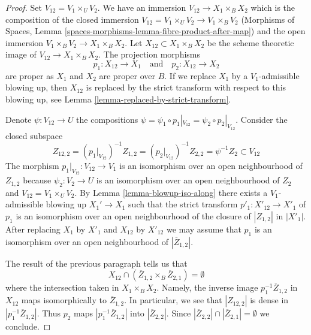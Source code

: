 \documentclass[10pt,a4paper]{amsart}
\theoremstyle{plain}
\theoremstyle{definition}
\theoremstyle{remark}
\numberwithin{equation}{subsection}
\begin{document}
\begin{proof}
\medskip\noindent
Set $V_{12} = V_1 \times_U V_2$. We have an immersion
$V_{12} \to X_1 \times_B X_2$ which is the composition of the closed
immersion $V_{12} = V_1 \times_U V_2 \to V_1 \times_B V_2$
(Morphisms of Spaces, Lemma
\ref{spaces-morphisms-lemma-fibre-product-after-map})
and the open immersion $V_1 \times_B V_2 \to X_1 \times_B X_2$.
Let $X_{12} \subset X_1 \times_B X_2$ be the scheme theoretic image of
$V_{12} \to X_1 \times_B X_2$. The projection morphisms
$$
p_1 : X_{12} \to X_1
\quad\text{and}\quad
p_2 : X_{12} \to X_2
$$
are proper as $X_1$ and $X_2$ are proper over $B$. If we replace $X_1$ by a
$V_1$-admissible blowing up, then $X_{12}$ is replaced by
the strict transform with respect to this blowing up, see
Lemma \ref{lemma-replaced-by-strict-transform}.

\medskip\noindent
Denote $\psi : V_{12} \to U$ the compositions
$\psi = \psi_1 \circ p_1|_{V_{12}} = \psi_2 \circ p_2|_{V_{12}}$.
Consider the closed subspace
$$
Z_{12, 2} =
(p_1|_{V_{12}})^{-1}Z_{1, 2} =
(p_2|_{V_{12}})^{-1}Z_{2, 2} =
\psi^{-1}Z_2 \subset V_{12}
$$
The morphism $p_1|_{V_{12}} : V_{12} \to V_1$ is an isomorphism
over an open neighbourhood of $Z_{1, 2}$ because $\psi_2 : V_2 \to U$
is an isomorphism over an open neighbourhood of $Z_2$ and
$V_{12} = V_1 \times_U V_2$. By Lemma \ref{lemma-blowup-iso-along}
there exists a $V_1$-admissible blowing up $X_1' \to X_1$
such that the strict transform $p'_1 : X'_{12} \to X'_1$
of $p_1$ is an isomorphism over an open neighbourhood of
the closure of $|Z_{1, 2}|$ in $|X'_1|$.
After replacing $X_1$ by $X'_1$ and $X_{12}$ by $X'_{12}$
we may assume that $p_1$ is an isomorphism over an open
neighbourhood of $|\overline{Z}_{1, 2}|$.

\medskip\noindent
The result of the previous paragraph tells us that
$$
X_{12} \cap (\overline{Z}_{1, 2} \times_B \overline{Z}_{2, 1}) = \emptyset
$$
where the intersection taken in $X_1 \times_B X_2$. Namely, the inverse
image $p_1^{-1}\overline{Z}_{1, 2}$ in $X_{12}$ maps isomorphically
to $\overline{Z}_{1, 2}$. In particular, we see that $|Z_{12, 2}|$
is dense in $|p_1^{-1}\overline{Z}_{1, 2}|$. Thus $p_2$ maps
$|p_1^{-1}\overline{Z}_{1, 2}|$ into $|\overline{Z}_{2, 2}|$.
Since $|\overline{Z}_{2, 2}| \cap |\overline{Z}_{2, 1}| = \emptyset$
we conclude.


\end{proof}
\end{document}
